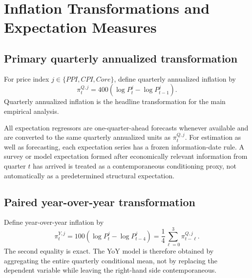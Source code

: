 \documentclass[11pt]{article}
\begin{document}
\section{Inflation Transformations and Expectation Measures}

\subsection{Primary quarterly annualized transformation}

For price index $j\in\{PPI,CPI,Core\}$, define quarterly annualized inflation by
\begin{equation}
\pi_{t}^{Q,j}
=
400\left(\log P_t^j-\log P_{t-1}^j\right).
\label{eq:inflation_qoq}
\end{equation}
Quarterly annualized inflation is the headline transformation for the main empirical analysis.

All expectation regressors are one-quarter-ahead forecasts whenever available and are converted to the same quarterly annualized units as $\pi_t^{Q,j}$. For estimation as well as forecasting, each expectation series has a frozen information-date rule. A survey or model expectation formed after economically relevant information from quarter $t$ has arrived is treated as a contemporaneous conditioning proxy, not automatically as a predetermined structural expectation.

\subsection{Paired year-over-year transformation}

Define year-over-year inflation by
\begin{equation}
\pi_t^{Y,j}
=
100\left(\log P_t^j-\log P_{t-4}^j\right)
=
\frac{1}{4}\sum_{\ell=0}^{3}\pi_{t-\ell}^{Q,j}.
\label{eq:inflation_yoy}
\end{equation}
The second equality is exact. The YoY model is therefore obtained by aggregating the entire quarterly conditional mean, not by replacing the dependent variable while leaving the right-hand side contemporaneous.
\end{document}
